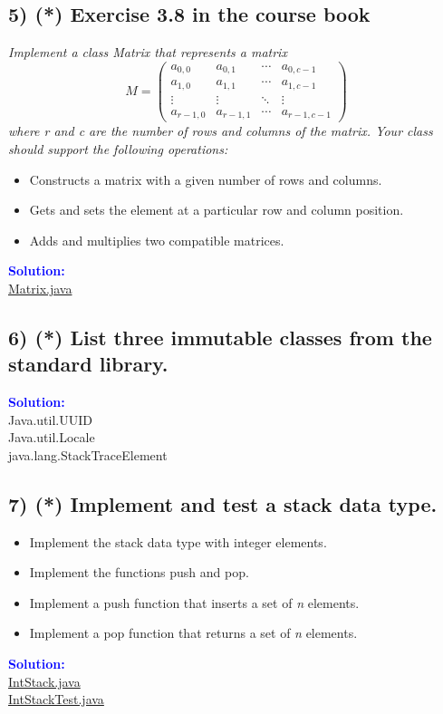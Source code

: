 \documentclass{article}
\begin{document}
\subsection*{5) (*) Exercise 3.8 in the course book}
\hypertarget{E5}{ }
\textit{Implement a class Matrix that represents a matrix}\\
$$ 
M = \left( 
\begin{matrix}
a_{0,0} & a_{0,1} & \cdots & a_{0,c-1} \\
a_{1,0} & a_{1,1} & \cdots & a_{1,c-1} \\
\vdots & \vdots & \ddots & \vdots \\
a_{r-1,0} & a_{r-1,1} & \cdots & a_{r-1,c-1} 
\end{matrix} \right)
$$
\textit{
where r and c are the number of rows and columns of the matrix. Your class should support the
following operations:}\\
\begin{itemize}
    \item Constructs a matrix with a given number of rows and columns.
    \item Gets and sets the element at a particular row and column position.
    \item Adds and multiplies two compatible matrices.
\end{itemize}
\indent \textbf{\textcolor{blue}{Solution:}} \\
\hyperlink{Matrix}{Matrix.java}

\subsection*{6) (*) List three immutable classes from the standard library.}
\hypertarget{E6}{ }
\indent \textbf{\textcolor{blue}{Solution:}} \\
\textcolor{MycolorOrange}{Java.util.UUID} \\
\textcolor{MycolorOrange}{Java.util.Locale} \\
\textcolor{MycolorOrange}{java.lang.StackTraceElement}


\subsection*{7) (*) Implement and test a stack data type.}
\hypertarget{E7}{ }
\begin{itemize}
    \item Implement the stack data type with integer elements.
    \item Implement the functions push and pop.
    \item Implement a push function that inserts a set of \textit{n} elements.
    \item Implement a pop function that returns a set of \textit{n} elements.
\end{itemize}
\indent \textbf{\textcolor{blue}{Solution:}} \\
\hyperlink{IntStack}{IntStack.java}\\
\hyperlink{IntStackTest}{IntStackTest.java}
\end{document}
